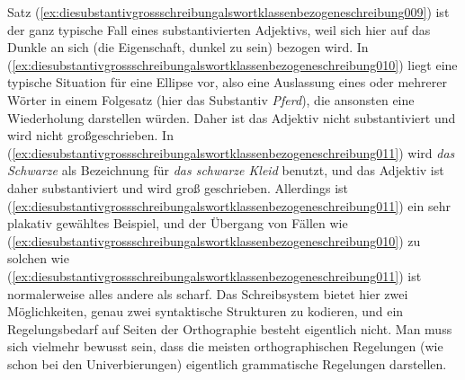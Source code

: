 \begin{exe}
  \ex\label{ex:diesubstantivgrossschreibungalswortklassenbezogeneschreibung008}
  \begin{xlist}
  \end{xlist}
\end{exe}

Satz (\ref{ex:diesubstantivgrossschreibungalswortklassenbezogeneschreibung009}) ist der ganz typische Fall eines substantivierten Adjektivs, weil sich hier auf das Dunkle an sich (die Eigenschaft, dunkel zu sein) bezogen wird.
In (\ref{ex:diesubstantivgrossschreibungalswortklassenbezogeneschreibung010}) liegt eine typische Situation für eine Ellipse vor, also eine Auslassung eines oder mehrerer Wörter in einem Folgesatz (hier das Substantiv \textit{Pferd}), die ansonsten eine Wiederholung darstellen würden.
Daher ist das Adjektiv nicht substantiviert und wird nicht großgeschrieben.
In (\ref{ex:diesubstantivgrossschreibungalswortklassenbezogeneschreibung011}) wird \textit{das Schwarze} als Bezeichnung für \textit{das schwarze Kleid} benutzt, und das Adjektiv ist daher substantiviert und wird groß geschrieben.
Allerdings ist (\ref{ex:diesubstantivgrossschreibungalswortklassenbezogeneschreibung011}) ein sehr plakativ gewähltes Beispiel, und der Übergang von Fällen wie (\ref{ex:diesubstantivgrossschreibungalswortklassenbezogeneschreibung010}) zu solchen wie (\ref{ex:diesubstantivgrossschreibungalswortklassenbezogeneschreibung011}) ist normalerweise alles andere als scharf.
Das Schreibsystem bietet hier zwei Möglichkeiten, genau zwei syntaktische Strukturen zu kodieren, und ein Regelungsbedarf auf Seiten der Orthographie besteht eigentlich nicht.
Man muss sich vielmehr bewusst sein, dass die meisten orthographischen Regelungen (wie schon bei den Univerbierungen) eigentlich grammatische Regelungen darstellen.

